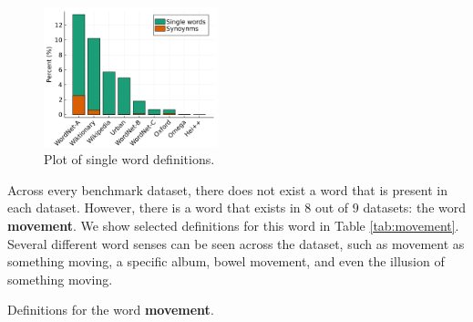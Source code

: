 \begin{figure}
    \centering
    \includegraphics[width=0.45\textwidth]{assets/plots/syn_counts.png}
    \caption{Plot of single word definitions.}
    \label{fig:single_word_defs}
\end{figure}

Across every benchmark dataset, there does not exist a word that is present in each dataset. However, there is a word that exists in $8$ out of $9$ datasets: the word \textbf{movement}. We show selected definitions for this word in Table \ref{tab:movement}. Several different word senses can be seen across the dataset, such as movement as something moving, a specific album, bowel movement, and even the illusion of something moving.

\begin{table}[h]
    \centering
    \caption{Definitions for the word \textbf{movement}.}
    
    \label{tab:movement}
\end{table}

